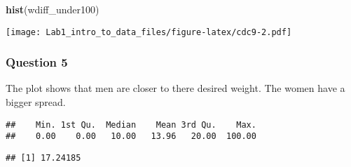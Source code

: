 \documentclass[]{article}
\newenvironment{Shaded}{\begin{snugshade}}{\end{snugshade}}
\newcommand{\DecValTok}[1]{\textcolor[rgb]{0.00,0.00,0.81}{#1}}
\newcommand{\KeywordTok}[1]{\textcolor[rgb]{0.13,0.29,0.53}{\textbf{#1}}}
\newcommand{\NormalTok}[1]{#1}
\newcommand{\OperatorTok}[1]{\textcolor[rgb]{0.81,0.36,0.00}{\textbf{#1}}}
\newcommand{\StringTok}[1]{\textcolor[rgb]{0.31,0.60,0.02}{#1}}
\begin{document}
\begin{Shaded}
\begin{Highlighting}[]
\KeywordTok{hist}\NormalTok{(wdiff_under100)}
\end{Highlighting}
\end{Shaded}

\texttt{[image: Lab1\_intro\_to\_data\_files/figure-latex/cdc9-2.pdf]}

\hypertarget{question-5-1}{%
\subsubsection{Question 5}\label{question-5-1}}

The plot shows that men are closer to there desired weight. The women
have a bigger spread.

\begin{Shaded}
\end{Shaded}

\begin{verbatim}
##    Min. 1st Qu.  Median    Mean 3rd Qu.    Max. 
##    0.00    0.00   10.00   13.96   20.00  100.00
\end{verbatim}

\begin{Shaded}
\end{Shaded}

\begin{verbatim}
## [1] 17.24185
\end{verbatim}
\end{document}
